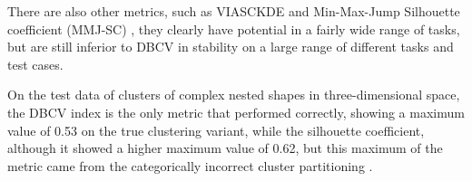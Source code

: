 There are also other metrics, such as VIASCKDE \parencite{viasckde2022} and Min-Max-Jump Silhouette coefficient (MMJ-SC)
\parencite{mmj2023liu, liu2024newindexclusteringevaluation}, they clearly have potential in a fairly wide range of tasks,
but are still inferior to DBCV in stability on a large range of different tasks and test cases.

On the test data of clusters of complex nested shapes in three-dimensional space, the DBCV index is the only metric that
performed correctly, showing a maximum value of 0.53 on the true clustering variant, while the silhouette coefficient,
although it showed a higher maximum value of 0.62, but this maximum of the metric came from the categorically incorrect
cluster partitioning \parencite{liu2024newindexclusteringevaluation}.